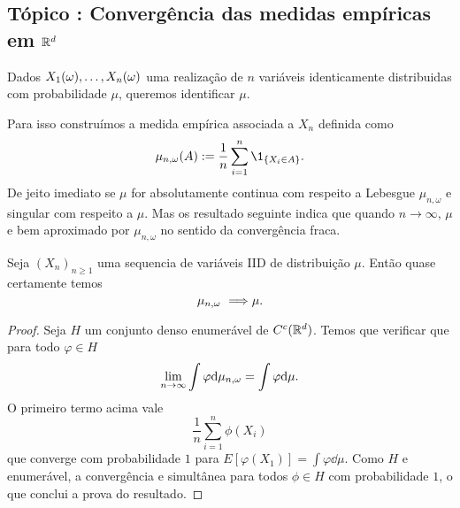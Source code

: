 \newpage

\begin{topics}
 \section{Tópico : Convergência das medidas empíricas em ${\mathbb R}^d$}


Dados $X_1(\omega),\dots, X_n(\omega)$ uma realização de $n$ variáveis identicamente distribuidas com probabilidade $\mu$, queremos identificar $\mu$.

\medskip

Para isso construímos a medida empírica associada a $X_n$ definida como
\begin{equation}
\mu_{n,\omega}(A):=\frac{1}{n}\sum_{i=1}^n \1_{\{X_i\in A\}}.
\end{equation}
De jeito imediato se $\mu$ for absolutamente continua com respeito a Lebesgue $\mu_{n,\omega}$ e singular com respeito a $\mu$.
Mas os resultado seguinte indica que quando $n\to \infty$, $\mu$ e bem aproximado por $\mu_{n,\omega}$ no sentido da convergência fraca.

\begin{theorem}
 Seja $(X_n)_{n\ge 1}$ uma sequencia de variáveis IID de distribuição $\mu$.
 Então quase certamente temos
 \begin{equation*}
   \mu_{n,\go} \ \Longrightarrow \mu.
 \end{equation*}

 
 
\end{theorem}


\begin{proof}
Seja $H$ um conjunto denso enumerável de $C^c({\mathbb R}^d)$.
Temos que verificar que para todo $\varphi\in H$ 
\begin{equation}
\lim_{n\to \infty} \int \varphi \mathrm{d} \mu_{n,\omega}=  \int \varphi \mathrm{d} \mu.
\end{equation}
O primeiro termo acima vale 
$$\frac{1}{n}\sum_{i=1}^n \phi(X_i)$$
que converge com probabilidade $1$ para $E[\varphi(X_1)]= \int \varphi \dd \mu.$
Como $H$ e enumerável, a convergência e simultânea para todos $\phi\in H$ com probabilidade $1$,
o que conclui a prova do resultado.

 
\end{proof}







\end{topics}

